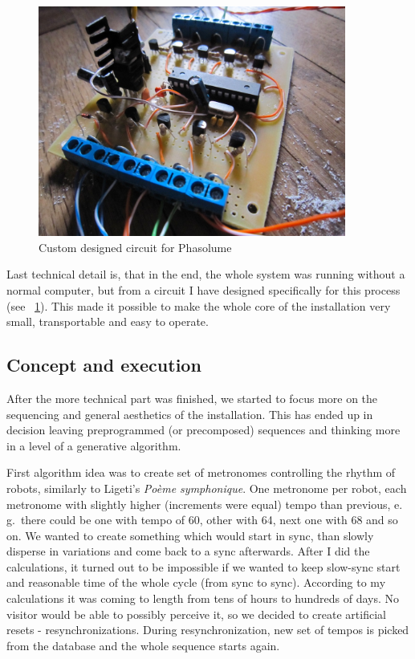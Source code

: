 \documentclass[12pt,a4paper,oneside]{report}
\begin{document}
\begin{figure}  
  \centering
    \includegraphics[width=0.9\textwidth]{img/phasolume}
	\caption{Custom designed circuit for Phasolume}
	\label{fig:phasolume}
\end{figure}

Last technical detail is, that in the end, the whole system was running without a normal computer, but from a circuit I have designed specifically for this process (see ~\ref{fig:phasolume}). This made it possible to make the whole core of the installation very small, transportable and easy to operate.

\subsection{Concept and execution} After the more technical part was finished, we started to focus more on the sequencing and general aesthetics of the installation. This has ended up in decision leaving preprogrammed (or precomposed) sequences and thinking more in a level of a generative algorithm. 

First algorithm idea was to create set of metronomes controlling the rhythm of robots, similarly to Ligeti's \emph{Poème symphonique}. One metronome per robot, each metronome with slightly higher (increments were equal) tempo than previous, e. g.\ there could be one with tempo of 60, other with 64, next one with 68 and so on. We wanted to create something which would start in sync, than slowly disperse in variations and come back to a sync afterwards. After I did the calculations, it turned out to be impossible if we wanted to keep slow-sync start and reasonable time of the whole cycle (from sync to sync). According to my calculations it was coming to length from tens of hours to hundreds of days. No visitor would be able to possibly perceive it, so we decided to create artificial resets - resynchronizations. During resynchronization, new set of tempos is picked from the database and the whole sequence starts again.
\end{document}
